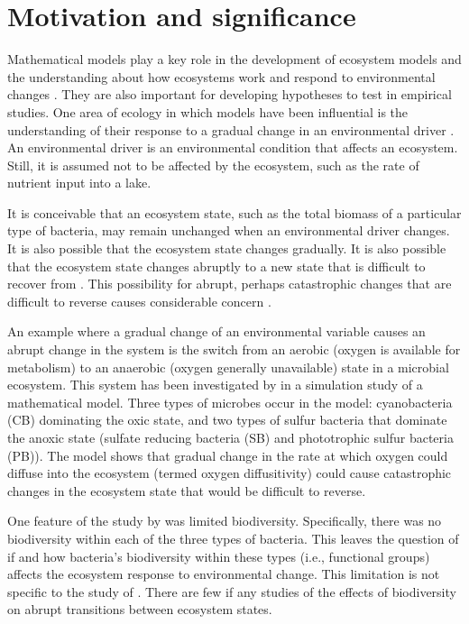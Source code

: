 \documentclass[preprint,12pt, a4paper]{elsarticle}
\begin{document}
\hypertarget{motivation-and-significance}{%
\section{Motivation and
significance}\label{motivation-and-significance}}

Mathematical models play a key role in the development of ecosystem
models and the understanding about how ecosystems work and respond to
environmental changes
\citep{Binzer2016a, Chaparro-Pedraza2021, Vasseur2005}. They are also
important for developing hypotheses to test in empirical studies. One
area of ecology in which models have been influential is the
understanding of their response to a gradual change in an environmental
driver \citep{Scheffer2001}. An environmental driver is an environmental
condition that affects an ecosystem. Still, it is assumed not to be
affected by the ecosystem, such as the rate of nutrient input into a
lake.

It is conceivable that an ecosystem state, such as the total biomass of
a particular type of bacteria, may remain unchanged when an
environmental driver changes. It is also possible that the ecosystem
state changes gradually. It is also possible that the ecosystem state
changes abruptly to a new state that is difficult to recover from
\citep{Scheffer2001}. This possibility for abrupt, perhaps catastrophic
changes that are difficult to reverse causes considerable concern
\citep{Collins2021, Northrop2021, Vandermeer2019}.

An example where a gradual change of an environmental variable causes an
abrupt change in the system is the switch from an aerobic (oxygen is
available for metabolism) to an anaerobic (oxygen generally unavailable)
state in a microbial ecosystem. This system has been investigated by
\citet{Bush2017} in a simulation study of a mathematical model. Three
types of microbes occur in the model: cyanobacteria (CB) dominating the
oxic state, and two types of sulfur bacteria that dominate the anoxic
state (sulfate reducing bacteria (SB) and phototrophic sulfur bacteria
(PB)). The model shows that gradual change in the rate at which oxygen
could diffuse into the ecosystem (termed oxygen diffusitivity) could
cause catastrophic changes in the ecosystem state that would be
difficult to reverse.

One feature of the study by \citet{Bush2017} was limited biodiversity.
Specifically, there was no biodiversity within each of the three types
of bacteria. This leaves the question of if and how bacteria's
biodiversity within these types (i.e., functional groups) affects the
ecosystem response to environmental change. This limitation is not
specific to the study of \citet{Bush2017}. There are few if any studies
of the effects of biodiversity on abrupt transitions between ecosystem
states.
\end{document}
